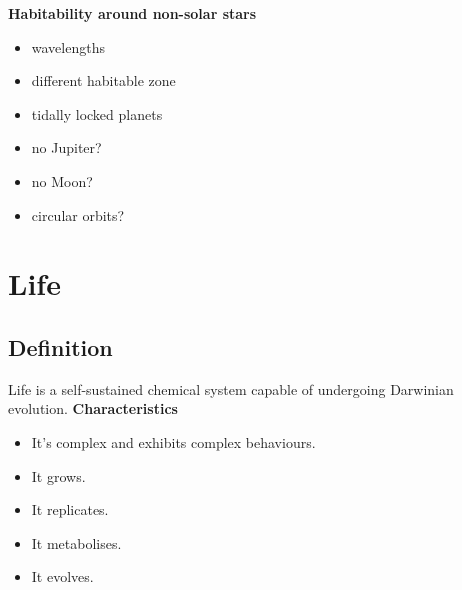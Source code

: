 \documentclass{article}
\theoremstyle{sltheorem}
\begin{document}
\textbf{Habitability around non-solar stars}
\begin{itemize}
    \item wavelengths
    \item different habitable zone
    \item tidally locked planets
    \item no Jupiter?
    \item no Moon?
    \item circular orbits?
\end{itemize}
\section{Life}
\subsection{Definition}
Life is a self-sustained chemical system capable of undergoing Darwinian evolution.
\textbf{Characteristics}
\begin{itemize}
    \item It's complex and exhibits complex behaviours.
    \item It grows.
    \item It replicates.
    \item It metabolises.
    \item It evolves.
\end{itemize}
\end{document}
